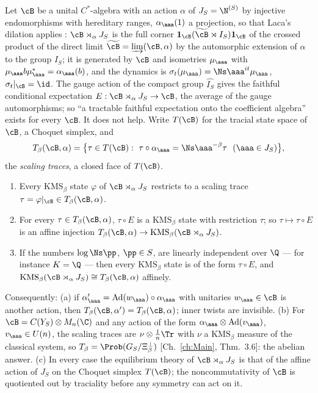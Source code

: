 Let $\cB$ be a unital $C^*$-algebra with an action $\alpha$ of $J_S=\N^{(S)}$ by injective
endomorphisms with hereditary ranges, $\alpha_\aaa(1)$ a projection, so that Laca's dilation
applies \cite{Laca}: $\cB\rtimes_\alpha J_S$ is the full corner $\mathbf 1_\cB(\widetilde\cB\rtimes I_S)\mathbf 1_\cB$
of the crossed product of the direct limit $\widetilde\cB=\varinjlim(\cB,\alpha)$ by the
automorphic extension of $\alpha$ to the group $I_S$; it is generated by $\cB$ and isometries
$\mu_\aaa$ with $\mu_\aaa b\mu_\aaa^*=\alpha_\aaa(b)$, and the dynamics is
$\sigma_t(\mu_\aaa)=\Ns\aaa^{it}\mu_\aaa$, $\sigma_t|_\cB=\id$. The gauge action of the
compact group $\widehat{I_S}$ gives the faithful conditional expectation
$E:\cB\rtimes_\alpha J_S\to\cB$, the average of the gauge automorphisms; so ``a tractable
faithful expectation onto the coefficient algebra'' exists for every $\cB$. It does not
help. Write $T(\cB)$ for the tracial state space of $\cB$, a Choquet simplex, and
\[
T_\beta(\cB,\alpha)=\bigl\{\tau\in T(\cB):\ \tau\circ\alpha_\aaa=\Ns\aaa^{-\beta}\tau\ \ (\aaa\in J_S)\bigr\},
\]
the \emph{scaling traces}, a closed face of $T(\cB)$.

\begin{theorem}\label{XXVII:thm:B}
\begin{enumerate}
\item Every $\mathrm{KMS}_\beta$ state $\varphi$ of $\cB\rtimes_\alpha J_S$ restricts to a
scaling trace $\tau=\varphi|_\cB\in T_\beta(\cB,\alpha)$.
\item For every $\tau\in T_\beta(\cB,\alpha)$, $\tau\circ E$ is a $\mathrm{KMS}_\beta$ state
with restriction $\tau$; so $\tau\mapsto\tau\circ E$ is an affine injection
$T_\beta(\cB,\alpha)\to\mathrm{KMS}_\beta(\cB\rtimes_\alpha J_S)$.
\item If the numbers $\log\Ns\pp$, $\pp\in S$, are linearly independent over $\Q$ --- for
instance $K=\Q$ --- then every $\mathrm{KMS}_\beta$ state is of the form $\tau\circ E$, and
$\mathrm{KMS}_\beta(\cB\rtimes_\alpha J_S)\cong T_\beta(\cB,\alpha)$ affinely.
\end{enumerate}
Consequently: (a) if $\alpha'_\aaa=\mathrm{Ad}(w_\aaa)\circ\alpha_\aaa$ with unitaries
$w_\aaa\in\cB$ is another action, then $T_\beta(\cB,\alpha')=T_\beta(\cB,\alpha)$; inner twists
are invisible. (b) For $\cB=C(Y_S)\otimes M_n(\C)$ and any action of the form
$\alpha_\aaa\otimes\mathrm{Ad}(v_\aaa)$, $v_\aaa\in U(n)$, the scaling traces are
$\nu\otimes\frac1n\Tr$ with $\nu$ a $\mathrm{KMS}_\beta$ measure of the classical system, so
$T_\beta=\Prob(G_S/\Xi_\beta^\perp)$ [Ch.~\ref{ch:Main}, Thm.~3.6]: the abelian answer. (c) In every
case the equilibrium theory of $\cB\rtimes_\alpha J_S$ is that of the affine action of
$J_S$ on the Choquet simplex $T(\cB)$; the noncommutativity of $\cB$ is quotiented out by
traciality before any symmetry can act on it.
\end{theorem}

